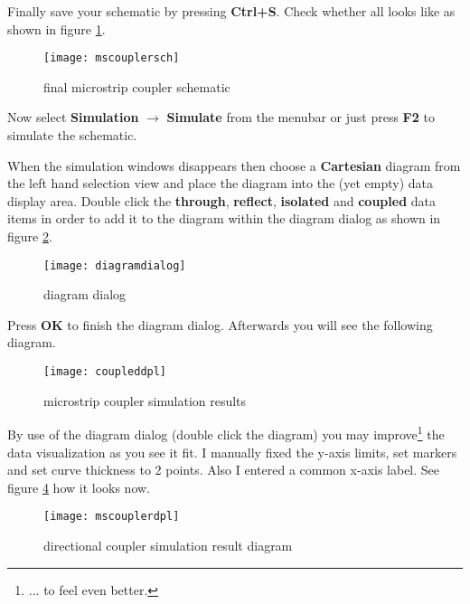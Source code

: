 \addvspace{12pt}

Finally save your schematic by pressing \textbf{Ctrl+S}.  Check
whether all looks like as shown in figure \ref{fig:mscouplersch}.

\begin{figure}[ht]
  \centering
  \texttt{[image: mscouplersch]}
  \caption{final microstrip coupler schematic}
  \label{fig:mscouplersch}
\end{figure}
\FloatBarrier

Now select \textbf{Simulation} $\rightarrow$ \textbf{Simulate} from
the menubar or just press \textbf{F2} to simulate the schematic.

\addvspace{12pt}

When the simulation windows disappears then choose a
\textbf{Cartesian} diagram from the left hand selection view and place
the diagram into the (yet empty) data display area.  Double click the
\textbf{through}, \textbf{reflect}, \textbf{isolated} and
\textbf{coupled} data items in order to add it to the diagram within
the diagram dialog as shown in figure \ref{fig:diagramdialog}.

\begin{figure}[ht]
  \centering
  \texttt{[image: diagramdialog]}
  \caption{diagram dialog}
  \label{fig:diagramdialog}
\end{figure}
\FloatBarrier

Press \textbf{OK} to finish the diagram dialog.  Afterwards you will
see the following diagram.

\begin{figure}[ht]
  \centering
  \texttt{[image: coupleddpl]}
  \caption{microstrip coupler simulation results}
  \label{fig:coupleddpl}
\end{figure}
\FloatBarrier


By use of the diagram dialog (double click the diagram) you may
improve\footnote{... to feel even better.} the data visualization as
you see it fit.  I manually fixed the y-axis limits, set markers and
set curve thickness to 2 points.  Also I entered a common x-axis
label.  See figure \ref{fig:mscouplerdpl} how it looks now.

\begin{figure}[ht]
  \centering
  \texttt{[image: mscouplerdpl]}
  \caption{directional coupler simulation result diagram}
  \label{fig:mscouplerdpl}
\end{figure}
\FloatBarrier

